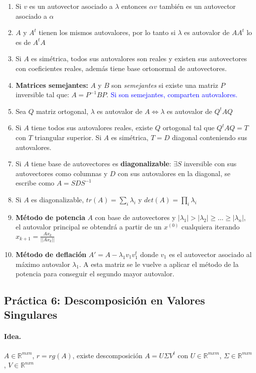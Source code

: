 \begin{enumerate}
    \item Si $v$ es un autovector asociado a $\lambda$ entonces $\alpha v$ también es un autovector asociado a $\alpha$
    \item $A$ y $A^t$ tienen los mismos autovalores, por lo tanto si $\lambda$ es autovalor de $AA^t$ lo es de $A^tA$ 
    \item Si $A$ es simétrica, todos sus autovalores son reales y existen sus autovectores con coeficientes reales, además tiene base ortonormal de autovectores.
    \item \textbf{Matrices semejantes:} $A$ y $B$ son \textit{semejantes} si existe una matriz $P$ inversible tal que: $A = P^{-1}BP$. \textcolor{blue}{Si son semejantes, comparten autovalores.} 
    \item Sea $Q$ matriz ortogonal, $\lambda$ es autovalor de $A \iff \lambda$ es autovalor de $Q^tAQ$
    \item Si $A$ tiene todos sus autovalores reales, existe $Q$ ortogonal tal que $Q^tAQ = T$ con $T$ triangular superior. Si $A$ es simétrica, $T = D$ diagonal conteniendo sus autovalores. 
    \item Si $A$ tiene base de autovectores es \textbf{diagonalizable}: $\exists S$ inversible con sus autovectores como columnas  y $D$ con sus autovalores en la diagonal, se escribe como $A = SDS^{-1}$
    \item Si $A$ es diagonalizable, $tr(A) = \sum_i \lambda_i$ y $det(A)=\prod_i \lambda_i$
    \item \textbf{Método de potencia} $A$ con base de autovectores y $|\lambda_1| > |\lambda_2| \geq \dots \geq |\lambda_n|$, el autovalor principal se obtendrá a partir de un $x^{(0)}$ cualquiera iterando $x_{k+1} = \frac{Ax_k}{||Ax_k||}$
    \item \textbf{Método de deflación} $A' = A - \lambda_1 v_1 v_1^t$ donde $v_1$ es el autovector asociado al máximo autovalor $\lambda_1$. A esta matriz se le vuelve a aplicar el método de la potencia para conseguir el segundo mayor autovalor.
    
\end{enumerate}

\subsection*{Práctica 6: Descomposición en Valores Singulares}

\paragraph{Idea.} $A \in \mathbb{R}^{mxn}$, $r = rg(A)$, existe descomposición $A=U\Sigma V^t$ con  $U \in \mathbb{R}^{mxm}$, $\Sigma \in \mathbb{R}^{mxn}$, $V\in \mathbb{R}^{nxn}$

